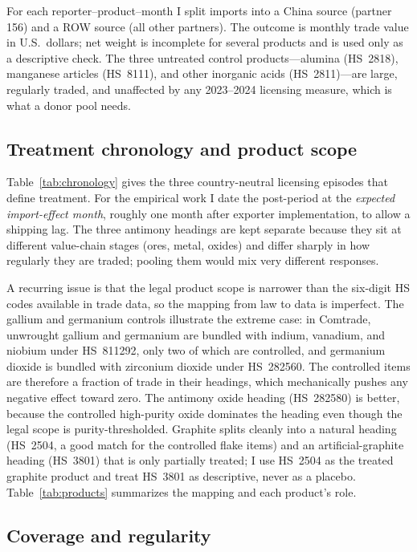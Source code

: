 \documentclass[12pt,a4paper]{article}
\begin{document}
For each reporter--product--month I split imports into a China source (partner
156) and a ROW source (all other partners). The outcome is monthly trade value
in U.S.\ dollars; net weight is incomplete for several products and is used only
as a descriptive check. The three untreated control products---alumina
(HS~2818), manganese articles (HS~8111), and other inorganic acids (HS~2811)---are
large, regularly traded, and unaffected by any 2023--2024 licensing measure,
which is what a donor pool needs.

\subsection{Treatment chronology and product scope}\label{sec:chronology}

Table~\ref{tab:chronology} gives the three country-neutral licensing episodes
that define treatment. For the empirical work I date the post-period at the
\emph{expected import-effect month}, roughly one month after exporter
implementation, to allow a shipping lag. The three antimony headings are kept
separate because they sit at different value-chain stages (ores, metal, oxides)
and differ sharply in how regularly they are traded; pooling them would mix very
different responses.

A recurring issue is that the legal product scope is narrower than the
six-digit HS codes available in trade data, so the mapping from law to data is
imperfect. The gallium and germanium controls illustrate the extreme case: in
Comtrade, unwrought gallium and germanium are bundled with indium, vanadium, and
niobium under HS~811292, only two of which are controlled, and germanium dioxide
is bundled with zirconium dioxide under HS~282560. The controlled items are
therefore a fraction of trade in their headings, which mechanically pushes any
negative effect toward zero. The antimony oxide heading (HS~282580) is better,
because the controlled high-purity oxide dominates the heading even though the
legal scope is purity-thresholded. Graphite splits cleanly into a natural
heading (HS~2504, a good match for the controlled flake items) and an
artificial-graphite heading (HS~3801) that is only partially treated; I use
HS~2504 as the treated graphite product and treat HS~3801 as descriptive, never
as a placebo. Table~\ref{tab:products} summarizes the mapping and each
product's role.




\subsection{Coverage and regularity}\label{sec:coverage}
\end{document}
